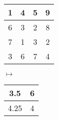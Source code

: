 \documentclass{article}
\begin{document}
\centering
\begin{figure}[htbp]
    \begin{minipage}{0.20\linewidth}
        \begin{tabular}{|c|c|c|c|}%
            \hline  %
            1 & 4 & 5 & 9 \\
            \hline
            6 & 3 & 2 & 8 \\
            \hline
            7 & 1 & 3 & 2 \\
            \hline
            3 & 6 & 7 & 4 \\
            \hline
        \end{tabular}
    \end{minipage}
    $\mapsto$
    \begin{minipage}{0.12\linewidth}
        \begin{tabular}{|c|c|}%
            \hline  %
            3.5  & 6 \\
            \hline  %
            4.25 & 4 \\
            \hline
        \end{tabular}
    \end{minipage}
\end{figure}
\end{document}
